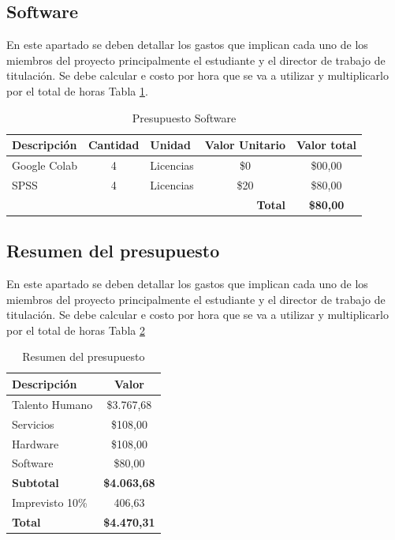 \subsection{Software}
En este apartado se deben detallar los gastos que implican cada uno de los miembros del proyecto principalmente el estudiante y el director de trabajo de titulación. Se debe calcular e costo por hora que se va a utilizar y multiplicarlo por el total de horas Tabla \ref{tab:presupuesto-software}.

\begin{table}[H]
\centering
\caption{Presupuesto Software}
\label{tab:presupuesto-software}
\begin{tabular}{|l|c|l|c|c|}
\hline
\rowcolor[HTML]{B6DAF8}
\textbf{Descripción} & \textbf{Cantidad} & \textbf{Unidad} & \textbf{Valor Unitario} & \textbf{Valor total} \\ \hline
Google Colab         & 4                & Licencias       & \$0                     & \$00,00              \\ \hline
SPSS                 & 4                & Licencias       & \$20                    & \$80,00              \\ \hline
\multicolumn{4}{|r|}{\textbf{Total}}                         & \textbf{\$80,00}        \\ \hline
\end{tabular}
\end{table}

\subsection{Resumen del presupuesto}
En este apartado se deben detallar los gastos que implican cada uno de los miembros del proyecto principalmente el estudiante y el director de trabajo de titulación. Se debe calcular e costo por hora que se va a utilizar y multiplicarlo por el total de horas Tabla \ref{tab:resumen-presupuesto}

\begin{table}[H]
\centering
\caption{Resumen del presupuesto}
\label{tab:resumen-presupuesto}
\begin{tabular}{|l|c|}
\hline
\rowcolor[HTML]{B6DAF8}
\textbf{Descripción}     & \textbf{Valor}    \\ \hline
Talento Humano           & \$3.767,68        \\ \hline
Servicios                & \$108,00          \\ \hline
Hardware                 & \$108,00          \\ \hline
Software                 & \$80,00           \\ \hline
\textbf{Subtotal}        & \textbf{\$4.063,68} \\ \hline
Imprevisto 10\%          & 406,63            \\ \hline
\rowcolor[HTML]{5BC0DE}
\textbf{Total}           & \textbf{\$4.470,31} \\ \hline
\end{tabular}
\end{table}
